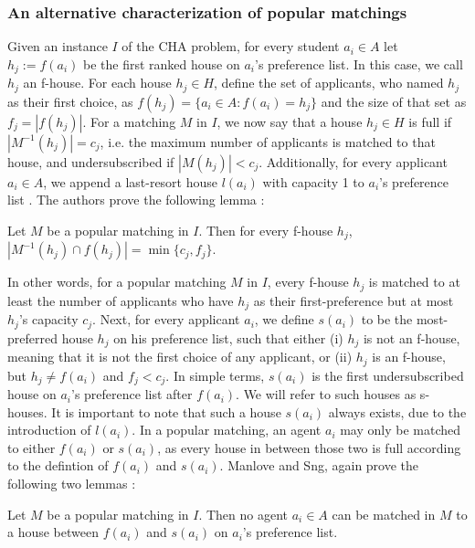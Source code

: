\subsubsection{An alternative characterization of popular matchings}
Given an instance $I$ of the CHA problem, for every student $a_i \in A$ let $h_j := f(a_i)$ be the first ranked house on $a_i$'s preference list. In this case, we call $h_j$ an f-house. For each house $h_j \in H$, define the set of applicants, who named $h_j$ as their first choice, as $f(h_j) = \{a_i \in A: f(a_i) = h_j\}$ and the size of that set as $f_j = |f(h_j)|$. For a matching $M$ in $I$, we now say that a house $h_j \in H$ is full if $|M^{-1}(h_j)| = c_j$, i.e. the maximum number of applicants is matched to that house, and undersubscribed if $|M(h_j)| < c_j$. Additionally, for every applicant $a_i \in A$, we append a last-resort house $l(a_i)$ with capacity 1 to $a_i$'s preference list \cite{ManlovePopularMatchings}. The authors prove the following lemma \cite{ManlovePopularMatchings}:
\newtheorem{lemma-popular-1}[theorem]{Lemma}
\begin{lemma}\label{lemma-popular1}
    Let $M$ be a popular matching in $I$. Then for every f-house $h_j$, $|M^{-1}(h_j) \cap f(h_j)| = \min\{c_j, f_j\}$.
\end{lemma} 
In other words, for a popular matching $M$ in $I$, every f-house $h_j$ is matched to at least the number of applicants who have $h_j$ as their first-preference but at most $h_j$'s capacity $c_j$. Next, for every applicant $a_i$, we define $s(a_i)$ to be the most-preferred house $h_j$ on his preference list, such that either (i) $h_j$  is not an f-house, meaning that it is not the first choice of any applicant, or (ii) $h_j$ is an f-house, but $h_j \neq f(a_i)$ and $f_j < c_j$. In simple terms, $s(a_i)$ is the first undersubscribed house on $a_i$'s preference list after $f(a_i)$. We will refer to such houses as s-houses. It is important to note that such a house $s(a_i)$ always exists, due to the introduction of $l(a_i)$. In a popular matching, an agent $a_i$ may only be matched to either $f(a_i)$ or $s(a_i)$, as every house in between those two is full according to the defintion of $f(a_i)$ and $s(a_i)$. Manlove and Sng, again prove the following two lemmas \cite{ManlovePopularMatchings}: 

\newtheorem{lemma-popular-2}[theorem]{Lemma}
\begin{lemma}\label{lemma-popular2}
    Let $M$ be a popular matching in $I$. Then no agent $a_i \in A$ can be matched in $M$ to a house between $f(a_i)$ and $s(a_i)$ on $a_i$'s preference list.
\end{lemma} 

